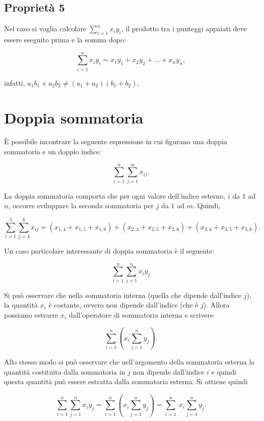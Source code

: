 \documentclass[
  11pt,
]{krantz}
\theoremstyle{definition}
\theoremstyle{definition}
\theoremstyle{definition}
\theoremstyle{definition}
\theoremstyle{remark}
\begin{document}
\hypertarget{proprietuxe0-5}{%
\subsection{Proprietà 5}\label{proprietuxe0-5}}

Nel caso si voglia calcolare \(\sum_{i=1}^{n} x_i y_i\), il prodotto tra i punteggi appaiati deve essere eseguito prima e la somma dopo:

\[
\sum_{i=1}^{n} x_i y_i = x_1 y_1 + x_2 y_2 + \dots + x_n y_n,
\]

infatti, \(a_1 b_1 + a_2 b_2 \neq (a_1 + a_2)(b_1 + b_2)\).

\hypertarget{doppia-sommatoria}{%
\section{Doppia sommatoria}\label{doppia-sommatoria}}

È possibile incontrare la seguente espressione in cui figurano una doppia sommatoria e un doppio indice:

\[
\sum_{i=1}^{n}\sum_{j=1}^{m} x_{ij}.
\]

La doppia sommatoria comporta che per ogni valore dell'indice esterno, \(i\) da \(1\) ad \(n\), occorre sviluppare la seconda sommatoria per \(j\) da \(1\) ad \(m\). Quindi,

\[
\sum_{i=1}^{3}\sum_{j=4}^{6} x_{ij} = (x_{1, 4} + x_{1, 5} + x_{1, 6}) + (x_{2, 4} + x_{2, 5} + x_{2, 6}) + (x_{3, 4} + x_{3, 5} + x_{3, 6}).
\]

Un caso particolare interessante di doppia sommatoria è il seguente:

\[
\sum_{i=1}^{n}\sum_{j=1}^{n} x_i y_j
\]

Si può osservare che nella sommatoria interna (quella che dipende dall'indice \(j\)), la quantità \(x_i\) è costante, ovvero non dipende dall'indice (che è \(j\)). Allora possiamo estrarre \(x_i\) dall'operatore di sommatoria interna e scrivere

\[
\sum_{i=1}^{n} \left( x_i \sum_{j=1}^{n} y_j \right).
\]

Allo stesso modo si può osservare che nell'argomento della sommatoria esterna la quantità costituita dalla sommatoria in \(j\) non dipende dall'indice \(i\) e quindi questa quantità può essere estratta dalla sommatoria esterna. Si ottiene quindi

\[
\sum_{i=1}^{n}\sum_{j=1}^{n} x_i y_j = \sum_{i=1}^{n} \left( x_i \sum_{j=1}^{n} y_j \right) = \sum_{i=1}^{n}\ x_i \sum_{j=1}^{n} y_j.
\]
\end{document}
